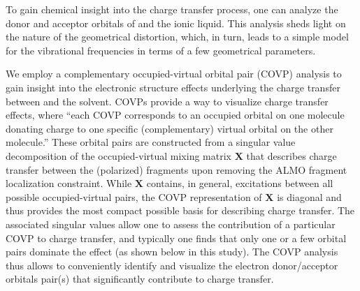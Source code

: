 \documentclass[%
  class = book,%
  crop = false,%
  float = true,%
  multi = true,%
  preview = false,%
]{standalone}
\begin{document}
{To gain chemical insight into the charge transfer process, one can analyze the donor and acceptor orbitals of  and the ionic liquid. This analysis sheds light on the nature of the geometrical distortion, which, in turn, leads to a simple model for the vibrational frequencies in terms of a few geometrical parameters.

We employ a complementary occupied-virtual orbital pair (COVP) analysis\cite{Khaliullin2008} to gain insight into the electronic structure effects underlying the charge transfer between  and the solvent. COVPs provide a way to visualize charge transfer effects, where ``each COVP corresponds to an occupied orbital on one molecule donating charge to one specific (complementary) virtual orbital on the other molecule.''\cite{Khaliullin2009} These orbital pairs are constructed from a singular value decomposition of the occupied-virtual mixing matrix \(\mathbf{X}\) that describes charge transfer between the (polarized) fragments upon removing the ALMO fragment localization constraint. While \(\mathbf{X}\) contains, in general, excitations between all possible occupied-virtual pairs, the COVP representation of \(\mathbf{X}\) is diagonal and thus provides the most compact possible basis for describing charge transfer.  The associated singular values allow one to assess the contribution of a particular COVP to charge transfer, and typically one finds that only one or a few orbital pairs dominate the effect (as shown below in this study). The COVP analysis thus allows to conveniently identify and visualize the electron donor/acceptor orbitals pair(s) that significantly contribute to charge transfer.

}
\end{document}
